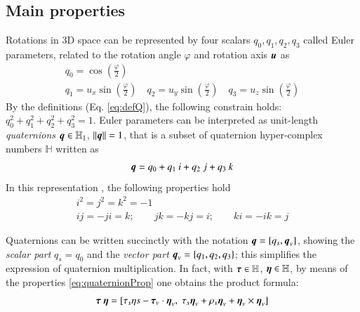 \subsection{Main properties}
Rotations in 3D space can be represented by four scalars $q_0,q_1,q_2,q_3$
called Euler parameters, related to the rotation angle $\varphi$ and rotation axis ${\boldsymbol{u}}$ as \cite{tasora}
%
\begin{equation}
    \begin{array}{c}
    	{q}_0 = \cos \left(\frac{\varphi}{2} \right) \\[2ex]
     	{q}_1 = u_x \sin \left(\frac{\varphi}{2}\right)  \quad
     	{q}_2 = u_y \sin \left(\frac{\varphi}{2}\right)  \quad
     	{q}_3 = u_z \sin \left(\frac{\varphi}{2}\right) 	
    \end{array}
    \label{eq:defQ}
\end{equation}
By the definitions (Eq. \ref{eq:defQ}), the following constrain holds: $q_0^2+q_1^2+q_2^2+q_3^2=1$.
Euler parameters can be interpreted as unit-length \textit{quaternions} ${\boldsymbol{q}} \in \mathbb{H}_1$, $||{\boldsymbol{q}}||=1$, that is a subset of quaternion hyper-complex numbers $\mathbb{H}$ written as
\begin{equation}
    {\boldsymbol{q}}= q_0 + q_1\: i + q_2\: j + q_3\: k  
    \label{eq:quaternion}
\end{equation}
In this representation \cite{hamilton1844ii}, the following properties hold
\begin{equation}
    \begin{array}{c}
        i^2=j^2=k^2=-1\\[2ex]
        ij=-ji=k;\qquad jk=-kj=i; \qquad ki=-ik=j
    \end{array}
    \label{eq:quaternionProp}
\end{equation}

Quaternions can be written succinctly with the notation ${\boldsymbol{q}}=[q_{s},{\boldsymbol{q}}_{v}]$, showing the \textit{scalar part} $q_s=q_0$ and the \textit{vector part} ${\boldsymbol{q}}_v = \{q_1, q_2, q_3\}$; this simplifies the expression of quaternion multiplication. In fact, with ${\boldsymbol{\tau}}\in\mathbb{H}$, ${\boldsymbol{\eta}}\in\mathbb{H}$, by means of the properties \eqref{eq:quaternionProp} one obtains the product formula:
\begin{align} 
{\boldsymbol{\tau}} \: {\boldsymbol{\eta}} = [ \tau_{s}\eta{s} - {\boldsymbol{\tau}}_{v}\cdot{\boldsymbol{\eta}}_{v}, \;
\tau_{s}{\boldsymbol{\eta}}_{v} + \rho_{s}{\boldsymbol{\eta}}_{v} + {\boldsymbol{\eta}}_{v} \times {\boldsymbol{\eta}}_{v} ]
\end{align}

